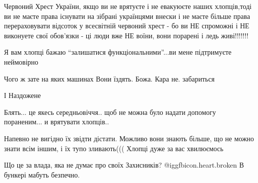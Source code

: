  
 
 
 
 
\zzSecCmt

\begin{itemize} %

Червоний Хрест України, якщо ви не врятуєте і не евакуюєте наших хлопців,тоді
ви не маєте права існувати на зібрані українцями внески і не маєте більше права
перераховувати відсоток у всесвітній червоний хрест - бо ви НЕ спроможні і НЕ
виконуете свої обов'язки - ці люди вже НЕ воїни, вони порарені і ледь
живі!!!!!!!


Я вам хлопці бажаю \enquote{залишатися функціональними}...ви мене підтримуєте
неймовірно

Чого ж зате на яких машинах Вони їздять. Божа. Кара не. забариться

І Наздожене


Блять... це якесь середньовіччя.. щоб не можна було надати допомогу
пораненим... и врятувати хлопців..


Напевно не вигідно їх звідти дістати.
Можливо вони знають більше, що не можно знати всім іншим, і їх тупо зливають(((
Хлопці дуже за вас хвилюємось


Що це за влада, яка не думає про своїх Захисників?  @igg{fbicon.heart.broken}
В бункері мабуть безпечно.
\end{itemize} %
